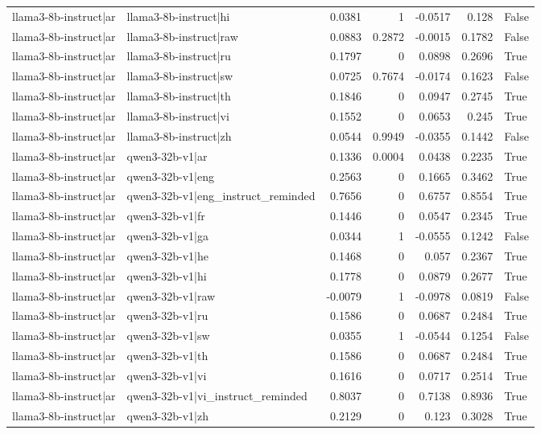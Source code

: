\begin{table}
\begin{tabular}{l l r r r r l}
llama3-8b-instruct|ar & llama3-8b-instruct|hi & 0.0381 & 1 & -0.0517 & 0.128 & False \\
llama3-8b-instruct|ar & llama3-8b-instruct|raw & 0.0883 & 0.2872 & -0.0015 & 0.1782 & False \\
llama3-8b-instruct|ar & llama3-8b-instruct|ru & 0.1797 & 0 & 0.0898 & 0.2696 & True \\
llama3-8b-instruct|ar & llama3-8b-instruct|sw & 0.0725 & 0.7674 & -0.0174 & 0.1623 & False \\
llama3-8b-instruct|ar & llama3-8b-instruct|th & 0.1846 & 0 & 0.0947 & 0.2745 & True \\
llama3-8b-instruct|ar & llama3-8b-instruct|vi & 0.1552 & 0 & 0.0653 & 0.245 & True \\
llama3-8b-instruct|ar & llama3-8b-instruct|zh & 0.0544 & 0.9949 & -0.0355 & 0.1442 & False \\
llama3-8b-instruct|ar & qwen3-32b-v1|ar & 0.1336 & 0.0004 & 0.0438 & 0.2235 & True \\
llama3-8b-instruct|ar & qwen3-32b-v1|eng & 0.2563 & 0 & 0.1665 & 0.3462 & True \\
llama3-8b-instruct|ar & qwen3-32b-v1|eng_instruct_reminded & 0.7656 & 0 & 0.6757 & 0.8554 & True \\
llama3-8b-instruct|ar & qwen3-32b-v1|fr & 0.1446 & 0 & 0.0547 & 0.2345 & True \\
llama3-8b-instruct|ar & qwen3-32b-v1|ga & 0.0344 & 1 & -0.0555 & 0.1242 & False \\
llama3-8b-instruct|ar & qwen3-32b-v1|he & 0.1468 & 0 & 0.057 & 0.2367 & True \\
llama3-8b-instruct|ar & qwen3-32b-v1|hi & 0.1778 & 0 & 0.0879 & 0.2677 & True \\
llama3-8b-instruct|ar & qwen3-32b-v1|raw & -0.0079 & 1 & -0.0978 & 0.0819 & False \\
llama3-8b-instruct|ar & qwen3-32b-v1|ru & 0.1586 & 0 & 0.0687 & 0.2484 & True \\
llama3-8b-instruct|ar & qwen3-32b-v1|sw & 0.0355 & 1 & -0.0544 & 0.1254 & False \\
llama3-8b-instruct|ar & qwen3-32b-v1|th & 0.1586 & 0 & 0.0687 & 0.2484 & True \\
llama3-8b-instruct|ar & qwen3-32b-v1|vi & 0.1616 & 0 & 0.0717 & 0.2514 & True \\
llama3-8b-instruct|ar & qwen3-32b-v1|vi_instruct_reminded & 0.8037 & 0 & 0.7138 & 0.8936 & True \\
llama3-8b-instruct|ar & qwen3-32b-v1|zh & 0.2129 & 0 & 0.123 & 0.3028 & True \\

\end{tabular}
\end{table}
